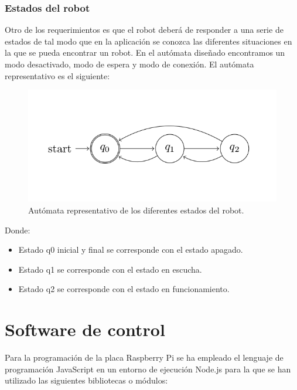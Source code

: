 \subsubsection{Estados del robot}

Otro de los requerimientos es que el robot deberá de responder a una serie de estados de tal modo que en la aplicación se conozca las diferentes situaciones en la que se pueda encontrar un robot.
En el autómata diseñado encontramos un modo desactivado, modo de espera y modo de conexión. El autómata representativo es el siguiente:\\

\begin{figure}[H]
  \begin{center}
    \includegraphics[scale=0.6]{imagenes/robot/automata-estados.png}
  \end{center}
  \caption{Autómata representativo de los diferentes estados del robot.}
  \label{figura:automata-estados}
\end{figure}

Donde:\\

\begin{itemize}
  \item Estado q0 inicial y final se corresponde con el estado apagado.
 \item Estado q1 se corresponde con el estado en escucha.
 \item Estado q2 se corresponde con el estado en funcionamiento.
\end{itemize}


\section{Software de control}
 
Para la programación de la placa Raspberry Pi se ha empleado el lenguaje de programación JavaScript en un entorno de ejecución Node.js para la que se han utilizado las siguientes 
bibliotecas o módulos:\\

